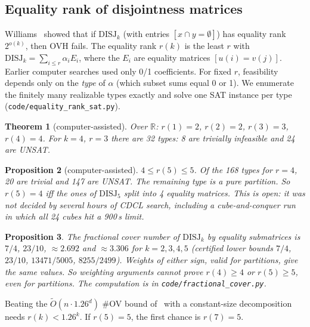 \documentclass[11pt,a4paper]{article}
\theoremstyle{plain}
\newtheorem{theorem}{Theorem}
\newtheorem{proposition}[theorem]{Proposition}
\theoremstyle{definition}
\theoremstyle{remark}
\newcommand{\DISJ}{\mathrm{DISJ}}
\newcommand{\R}{\mathbb{R}}
\newcommand{\code}[1]{\texttt{\small #1}}
\begin{document}
\subsection{Equality rank of disjointness matrices}
Williams~\cite{Wil24} showed that if $\DISJ_k$ (with entries $[x\cap y=\emptyset]$) has equality rank $2^{o(k)}$, then
OVH fails. The equality rank $r(k)$ is the least $r$ with $\DISJ_k=\sum_{i\le r}\alpha_iE_i$, where the $E_i$ are
equality matrices $[u(i)=v(j)]$. Earlier computer searches used only 0/1 coefficients. For fixed $r$, feasibility
depends only on the \emph{type} of $\alpha$ (which subset sums equal 0 or 1). We enumerate the finitely many realizable
types exactly and solve one SAT instance per type (\code{code/equality\_rank\_sat.py}).

\begin{theorem}[computer-assisted]\label{thm:eqrank}
Over $\R$: $r(1)=2$, $r(2)=2$, $r(3)=3$, $r(4)=4$. For $k=4$, $r=3$ there are 32 types: 8 are trivially infeasible and
24 are UNSAT.
\end{theorem}

\begin{proposition}[computer-assisted]\label{prop:k5}
$4\le r(5)\le5$. Of the 168 types for $r=4$, 20 are trivial and 147 are UNSAT. The remaining type is a pure partition.
So $r(5)=4$ iff the ones of $\DISJ_5$ split into 4 equality matrices. This is \emph{open}: it was not decided by
several hours of CDCL search, including a cube-and-conquer run in which all 24 cubes hit a 900\,s limit.
\end{proposition}

\begin{proposition}\label{prop:lp}
The fractional cover number of $\DISJ_k$ by equality submatrices is $7/4$, $23/10$, $\approx2.692$ and
$\approx3.306$ for $k=2,3,4,5$ (certified lower bounds $7/4$, $23/10$, $13471/5005$, $8255/2499$). Weights of either
sign, valid for partitions, give the same values. So weighting arguments cannot prove $r(4)\ge4$ or $r(5)\ge5$, even
for partitions. The computation is in \code{code/fractional\_cover.py}.
\end{proposition}

Beating the $\tilde O(n\cdot1.26^d)$ \#OV bound of~\cite{AL25} with a constant-size decomposition needs
$r(k)<1.26^k$. If $r(5)=5$, the first chance is $r(7)=5$.
\end{document}

